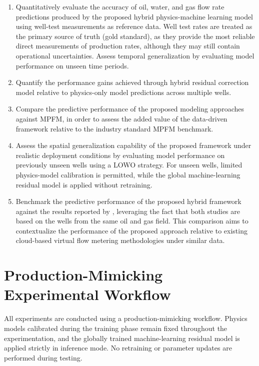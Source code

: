 \documentclass[12pt,APA]{uomthesis}
\begin{document}
\begin{enumerate}
    \item Quantitatively evaluate the accuracy of oil, water, and gas flow rate predictions produced by the proposed hybrid physics-machine learning model using well-test measurements as reference data. Well test rates are treated as the primary source of truth (gold standard), as they provide the most reliable direct measurements of production rates, although they may still contain operational uncertainties. Assess temporal generalization by evaluating model performance on unseen time periods.

    \item Quantify the performance gains achieved through hybrid residual correction model relative to physics-only model predictions across multiple wells.

    \item Compare the predictive performance of the proposed modeling approaches against MPFM, in order to assess the added value of the data-driven framework relative to the industry standard MPFM benchmark.

    \item Assess the spatial generalization capability of the proposed framework under realistic deployment conditions by evaluating model performance on previously unseen wells using a LOWO strategy. For unseen wells, limited physics-model calibration is permitted, while the global machine-learning residual model is applied without retraining.

    \item Benchmark the predictive performance of the proposed hybrid framework against the results reported by \citep{nemoto2023cloud}, leveraging the fact that both studies are based on the wells from the same oil and gas field. This comparison aims to contextualize the performance of the proposed approach relative to existing cloud-based virtual flow metering methodologies under similar data.
\end{enumerate}


\section{Production-Mimicking Experimental Workflow}
All experiments are conducted using a production-mimicking workflow. Physics models calibrated during the training phase remain fixed throughout the experimentation, and the globally trained machine-learning residual model is applied strictly in inference mode. No retraining or parameter updates are performed during testing.
\end{document}
